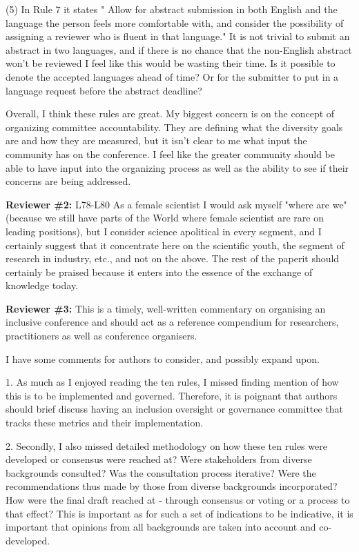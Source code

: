 \documentclass{article}
\begin{document}
(5) In Rule 7 it states " Allow for abstract submission in both English and the language the person feels more comfortable with, and consider the possibility of assigning a reviewer who is fluent in that language." It is not trivial to submit an abstract in two languages, and if there is no chance that the non-English abstract won't be reviewed I feel like this would be wasting their time. Is it possible to denote the accepted languages ahead of time? Or for the submitter to put in a language request before the abstract deadline?


Overall, I think these rules are great. My biggest concern is on the concept of organizing committee accountability. They are defining what the diversity goals are and how they are measured, but it isn't clear to me what input the community has on the conference. I feel like the greater community should be able to have input into the organizing process as well as the ability to see if their concerns are being addressed.

\textbf{Reviewer \#2:}
L78-L80 As a female scientist I would ask myself "where are we" (because we still have parts of the World where female scientist are rare on leading positions), but I consider science apolitical in every segment, and I certainly suggest that it concentrate here on the scientific youth, the segment of research in industry, etc., and not on the above.
The rest of the paperit should certainly be praised because it enters into the essence of the exchange of knowledge today.

\textbf{Reviewer \#3:} 
This is a timely, well-written commentary on organising an inclusive conference and should act as a reference compendium for researchers, practitioners as well as conference organisers.

I have some comments for authors to consider, and possibly expand upon.

1. As much as I enjoyed reading the ten rules, I missed finding mention of how this is to be implemented and governed. Therefore, it is poignant that authors should brief discuss having an inclusion oversight or governance committee that tracks these metrics and their implementation.

2. Secondly, I also missed detailed methodology on how these ten rules were developed or consensus were reached at? Were stakeholders from diverse backgrounds consulted? Was the consultation process iterative? Were the recommendations thus made by those from diverse backgrounds incorporated? How were the final draft reached at - through consensus or voting or a process to that effect? This is important as for such a set of indications to be indicative, it is important that opinions from all backgrounds are taken into account and co-developed.
\end{document}
